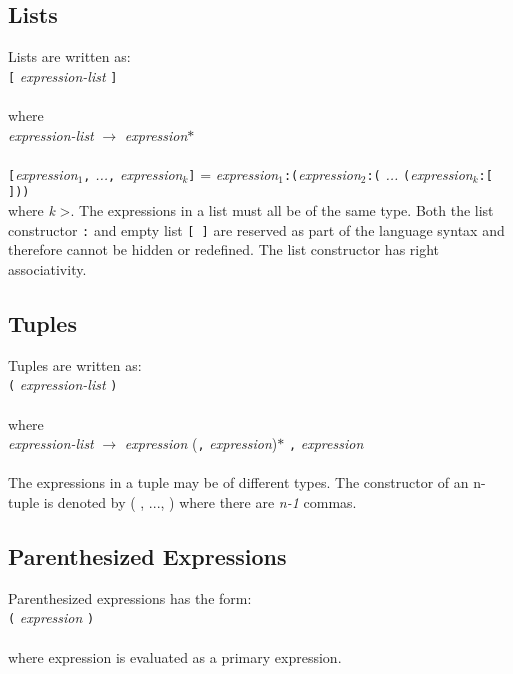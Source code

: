 \subsection{Lists}
Lists are written as: \\

  \texttt{[} \emph{expression-list} \texttt{]} \\ \\
  where \\
  
  \emph{expression-list} $\rightarrow$  \emph{expression}$*$ \\ \\
\texttt{[}\emph{expression$_{1}$}\texttt{,} \emph{...}\texttt{,} \emph{expression$_{k}$}\texttt{]} = 
  \emph{expression$_{1}$}\texttt{:(}\emph{expression$_{2}$}\texttt{:(} \emph{...} \texttt{(}\emph{expression$_{k}$}\texttt{:[ ]))} \\ 
where \textit{k} \textgreater{}. The expressions in a list must all be of the same type. Both the list constructor \texttt{:} and empty list \texttt{[ ]} are reserved as part of the language syntax and therefore cannot be hidden or redefined. The list constructor has right associativity.

\subsection{Tuples}
Tuples are written as: \\

  \texttt{(} \emph{expression-list} \texttt{)} \\ \\
  where \\
  
  \emph{expression-list} $\rightarrow$  \emph{expression} (\texttt{,} \emph{expression})$*$  \texttt{,} \emph{expression} \\ \\
The expressions in a tuple may be of different types. The constructor of an n-tuple is denoted by (\textunderscore
, ..., \textunderscore) where there are \textit{n-1} commas.

\subsection{Parenthesized Expressions}
Parenthesized expressions has the form: \\

  \texttt{(} \emph{expression} \texttt{)} \\ \\
  where expression is evaluated as a primary expression.

